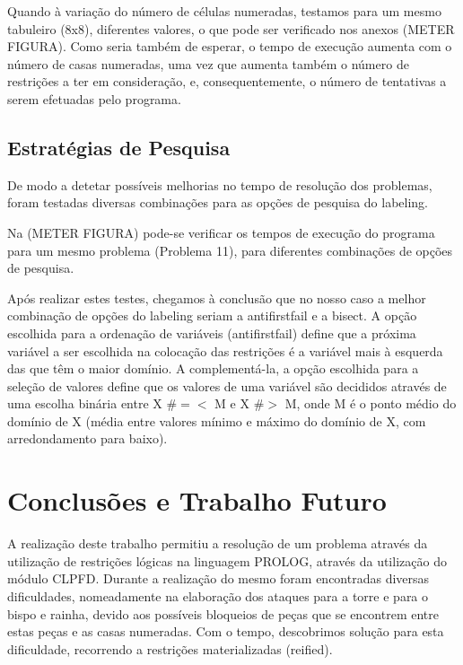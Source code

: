 \documentclass[runningheads]{llncs}
\begin{document}
Quando à variação do número de células numeradas, testamos para um mesmo tabuleiro (8x8), diferentes valores, o que pode ser verificado nos anexos (METER FIGURA).
Como seria também de esperar, o tempo de execução aumenta com o número de casas numeradas, uma vez que aumenta também o número de restrições a ter em consideração, e, consequentemente, o número de tentativas a serem efetuadas pelo programa.

\subsection{Estratégias de Pesquisa}

De modo a detetar possíveis melhorias no tempo de resolução dos problemas, foram testadas diversas combinações para as opções de pesquisa do labeling. 

Na (METER FIGURA) pode-se verificar os tempos de execução do programa para um mesmo problema (Problema 11), para diferentes combinações de opções de pesquisa.

Após realizar estes testes, chegamos à conclusão que no nosso caso a melhor combinação de opções do labeling seriam a anti\textunderscore first\textunderscore fail e
 a bisect.
A opção escolhida para a ordenação de variáveis (anti\textunderscore first\textunderscore fail) define que a próxima variável a ser escolhida na colocação 
das restrições é a variável mais à esquerda das que têm o maior domínio.
A complementá-la, a opção escolhida para a seleção de valores define que os valores de uma 
variável são decididos através de uma escolha binária entre X  \#$=<$ M e X  \#$>$ M, onde M 
é o ponto médio do domínio de X (média entre valores mínimo e máximo do domínio de X, 
com arredondamento para baixo).

\section{Conclusões e Trabalho Futuro}

A realização deste trabalho permitiu a resolução de um problema através da utilização de restrições lógicas na linguagem PROLOG,
através da utilização do módulo CLPFD.
Durante a realização do mesmo foram encontradas diversas dificuldades, nomeadamente na elaboração dos ataques para a torre e para o bispo e rainha, devido aos possíveis bloqueios de peças que se encontrem entre estas peças e as casas numeradas.
Com o tempo, descobrimos solução para esta dificuldade, recorrendo a restrições materializadas (reified).
\end{document}
